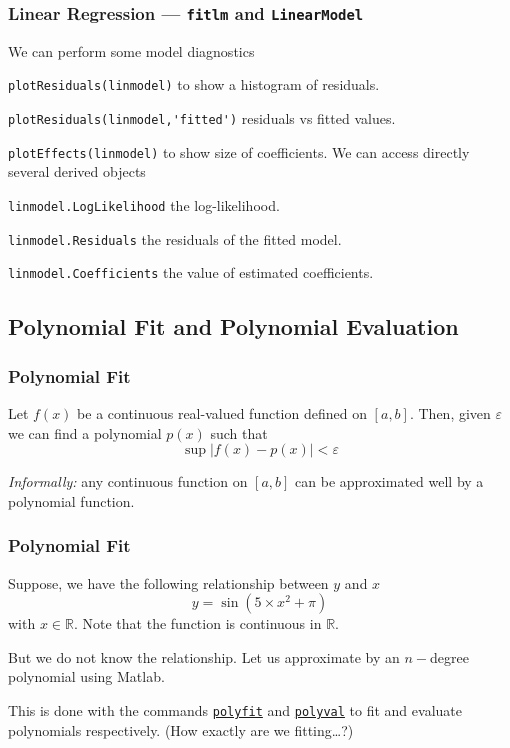 \documentclass[11pt,xcolor={svgnames},aspectratio=169,usepdftitle=false]{beamer}
\let\toneitemize\itemize
\let\ttwoitemize\enditemize
\renewenvironment{itemize}{\toneitemize\addtolength{\itemsep}{0.7\baselineskip}}{\ttwoitemize}
\begin{document}
\begin{frame}[fragile]
  \frametitle{Linear Regression --- \texttt{fitlm} and \texttt{LinearModel}}
We can perform some model diagnostics
\begin{itemize}
  \item \verb;plotResiduals(linmodel); to show a histogram of residuals.
  \item \verb;plotResiduals(linmodel,'fitted'); residuals vs fitted values.
  \item \verb;plotEffects(linmodel); to show size of coefficients.
\end{itemize}
We can access directly several derived objects
\begin{itemize}
  \item \verb;linmodel.LogLikelihood; the log-likelihood.
  \item \verb;linmodel.Residuals; the residuals of the fitted model.
  \item \verb;linmodel.Coefficients; the value of estimated coefficients.
\end{itemize}
\end{frame}

\subsection{Polynomial Fit and Polynomial Evaluation}

\begin{frame}
  \frametitle{Polynomial Fit}
\begin{theorem}
Let $f(x)$ be a continuous real-valued function defined on $[a,b]$. Then, given $\varepsilon$ we can find a polynomial $p(x)$ such that
\[
\sup \lvert f(x) - p(x) \rvert < \varepsilon  
\]
\end{theorem}
\textit{Informally:} any continuous function on $[a,b]$ can be approximated well by a polynomial function.
\end{frame}

\begin{frame}
  \frametitle{Polynomial Fit}
\begin{itemize}
  \item Suppose, we have the following relationship between $y$ and $x$
  \[
  y = \sin(5\times x^2 + \pi)
  \]
  with $x\in\mathbb{R}$. Note that the function is continuous in $\mathbb{R}$.
  \item But we do not know the relationship. Let us approximate by an $n-$degree polynomial using Matlab.
  \item This is done with the commands \href{https://www.mathworks.com/help/matlab/ref/polyfit.html}{\texttt{polyfit}} and \href{https://www.mathworks.com/help/matlab/ref/polyval.html}{\texttt{polyval}} to fit and evaluate polynomials respectively. \footnotesize (How exactly are we fitting\ldots ?)
\end{itemize}
\end{frame}
\end{document}
